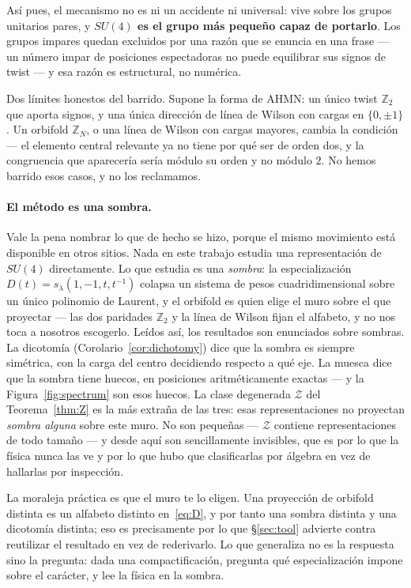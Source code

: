 \documentclass[11pt,a4paper]{article}
\newcommand{\ZZ}{\mathbb{Z}}
\begin{document}
Así pues, el mecanismo no es ni un accidente ni universal: vive sobre los grupos unitarios
pares, y \textbf{$SU(4)$ es el grupo más pequeño capaz de portarlo}. Los grupos impares quedan
excluidos por una razón que se enuncia en una frase --- un número impar de posiciones
espectadoras no puede equilibrar sus signos de twist --- y esa razón es estructural, no
numérica.

Dos límites honestos del barrido. Supone la forma de AHMN: un único twist $\ZZ_2$ que aporta
signos, y una única dirección de línea de Wilson con cargas en $\{0,\pm1\}$. Un orbifold
$\ZZ_N$, o una línea de Wilson con cargas mayores, cambia la condición --- el elemento central
relevante ya no tiene por qué ser de orden dos, y la congruencia que aparecería sería módulo
su orden y no módulo $2$. No hemos barrido esos casos, y no los reclamamos.

\paragraph{El método es una sombra.} Vale la pena nombrar lo que de hecho se hizo, porque el
mismo movimiento está disponible en otros sitios. Nada en este trabajo estudia una
representación de $SU(4)$ directamente. Lo que estudia es una \emph{sombra}: la
especialización $D(t)=s_\lambda(1,-1,t,t^{-1})$ colapsa un sistema de pesos cuadridimensional
sobre un único polinomio de Laurent, y el orbifold es quien elige el muro sobre el que
proyectar --- las dos paridades $\ZZ_2$ y la línea de Wilson fijan el alfabeto, y no nos toca
a nosotros escogerlo. Leídos así, los resultados son enunciados sobre sombras. La dicotomía
(Corolario~\ref{cor:dichotomy}) dice que la sombra es siempre simétrica, con la carga del
centro decidiendo respecto a qué eje. La muesca dice que la sombra tiene huecos, en posiciones
aritméticamente exactas --- y la Figura~\ref{fig:spectrum} son esos huecos. La clase degenerada
$\mathcal Z$ del Teorema~\ref{thm:Z} es la más extraña de las tres: esas representaciones no
proyectan \emph{sombra alguna} sobre este muro. No son pequeñas --- $\mathcal Z$ contiene
representaciones de todo tamaño --- y desde aquí son sencillamente invisibles, que es por lo
que la física nunca las ve y por lo que hubo que clasificarlas por álgebra en vez de hallarlas
por inspección.

La moraleja práctica es que el muro te lo eligen. Una proyección de orbifold distinta es un
alfabeto distinto en~\eqref{eq:D}, y por tanto una sombra distinta y una dicotomía distinta;
eso es precisamente por lo que \S\ref{sec:tool} advierte contra reutilizar el resultado en vez
de rederivarlo. Lo que generaliza no es la respuesta sino la pregunta: dada una
compactificación, pregunta qué especialización impone sobre el carácter, y lee la física en la
sombra.
\end{document}
